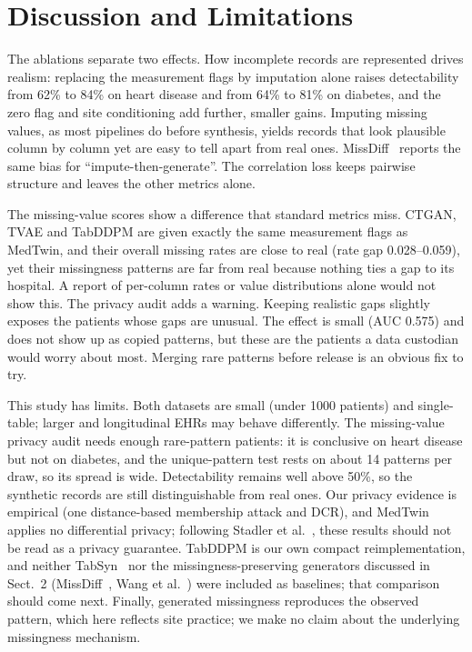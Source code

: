 \documentclass[runningheads]{llncs}
\begin{document}
\section{Discussion and Limitations}

The ablations separate two effects. How incomplete records are
represented drives realism: replacing the measurement flags by imputation
alone raises detectability from 62\% to 84\% on heart disease and from
64\% to 81\% on diabetes, and the zero flag and site conditioning add
further, smaller gains. Imputing missing values, as most pipelines do
before synthesis, yields records that look plausible column by column yet
are easy to tell apart from real ones. MissDiff~\cite{ouyang2023missdiff}
reports the same bias for ``impute-then-generate''. The correlation loss
keeps pairwise structure and leaves the other metrics alone.

The missing-value scores show a difference that standard metrics
miss. CTGAN, TVAE and TabDDPM are given exactly the same measurement flags
as MedTwin, and their overall missing rates are close to real (rate gap
0.028--0.059), yet their missingness patterns are far from real because
nothing ties a gap to its hospital. A report of per-column rates or value distributions alone would not
show this. The privacy audit adds a warning. Keeping realistic gaps
slightly exposes the patients whose gaps are unusual. The effect is small
(AUC 0.575) and does not show up as copied patterns, but these are the
patients a data custodian would worry about most. Merging rare patterns
before release is an obvious fix to try.

This study has limits. Both datasets are small (under 1000 patients)
and single-table; larger and longitudinal EHRs may behave differently. The
missing-value privacy audit needs enough rare-pattern patients: it is
conclusive on heart disease but not on diabetes, and the unique-pattern test
rests on about 14 patterns per draw, so its spread is wide.
Detectability remains well above 50\%, so the synthetic records are still
distinguishable from real ones. Our privacy evidence is empirical (one
distance-based membership attack and DCR), and MedTwin applies no
differential privacy; following Stadler et al.~\cite{stadler2022groundhog},
these results should not be read as a privacy guarantee. TabDDPM is our own
compact reimplementation, and neither TabSyn~\cite{zhang2024tabsyn} nor the
missingness-preserving generators discussed in Sect.~2
(MissDiff~\cite{ouyang2023missdiff}, Wang et al.~\cite{wang2025reinvented})
were included as baselines; that comparison should come next. Finally, generated missingness reproduces
the observed pattern, which here reflects site practice; we make no claim
about the underlying missingness mechanism.
\end{document}
